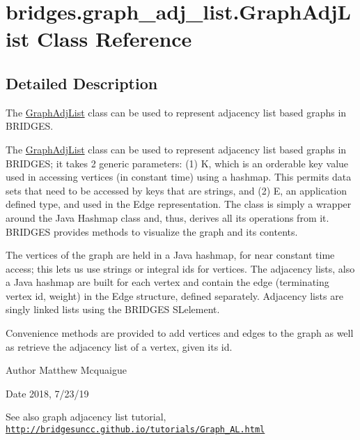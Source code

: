 \hypertarget{classbridges_1_1graph__adj__list_1_1_graph_adj_list}{}\section{bridges.\+graph\+\_\+adj\+\_\+list.\+Graph\+Adj\+List Class Reference}
\label{classbridges_1_1graph__adj__list_1_1_graph_adj_list}


\subsection{Detailed Description}
The \mbox{\hyperlink{classbridges_1_1graph__adj__list_1_1_graph_adj_list}{Graph\+Adj\+List}} class can be used to represent adjacency list based graphs in B\+R\+I\+D\+G\+ES. 

The \mbox{\hyperlink{classbridges_1_1graph__adj__list_1_1_graph_adj_list}{Graph\+Adj\+List}} class can be used to represent adjacency list based graphs in B\+R\+I\+D\+G\+ES; it takes 2 generic parameters\+: (1) K, which is an orderable key value used in accessing vertices (in constant time) using a hashmap. This permits data sets that need to be accessed by keys that are strings, and (2) E, an application defined type, and used in the Edge representation. The class is simply a wrapper around the Java Hashmap class and, thus, derives all its operations from it. B\+R\+I\+D\+G\+ES provides methods to visualize the graph and its contents.

The vertices of the graph are held in a Java hashmap, for near constant time access; this lets us use strings or integral ids for vertices. The adjacency lists, also a Java hashmap are built for each vertex and contain the edge (terminating vertex id, weight) in the Edge structure, defined separately. Adjacency lists are singly linked lists using the B\+R\+I\+D\+G\+ES S\+Lelement.

Convenience methods are provided to add vertices and edges to the graph as well as retrieve the adjacency list of a vertex, given its id.

\begin{DoxyAuthor}{Author}
Matthew Mcquaigue 
\end{DoxyAuthor}
\begin{DoxyDate}{Date}
2018, 7/23/19
\end{DoxyDate}
\begin{DoxySeeAlso}{See also}
graph adjacency list tutorial, \href{http://bridgesuncc.github.io/tutorials/Graph_AL.html}{\tt http\+://bridgesuncc.\+github.\+io/tutorials/\+Graph\+\_\+\+A\+L.\+html} 
\end{DoxySeeAlso}
